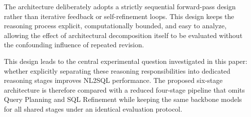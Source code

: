 \documentclass{svproc}
\begin{document}
The architecture deliberately adopts a strictly sequential forward-pass design rather than iterative feedback or self-refinement loops. This design keeps the reasoning process explicit, computationally bounded, and easy to analyze, allowing the effect of architectural decomposition itself to be evaluated without the confounding influence of repeated revision.

This design leads to the central experimental question investigated in this paper: whether explicitly separating these reasoning responsibilities into dedicated reasoning stages improves NL2SQL performance. The proposed six-stage architecture is therefore compared with a reduced four-stage pipeline that omits Query Planning and SQL Refinement while keeping the same backbone models for all shared stages under an identical evaluation protocol.


\end{document}

